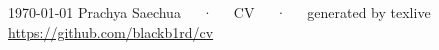 \documentclass[11pt, a4paper]{awesome-cv}
\begin{document}
\makecvheader[C]

\makecvfooter
  {\today}
  {Prachya Saechua~~~·~~~CV~~~·~~~generated by texlive \href{https://github.com/blackb1rd/cv}{https://github.com/blackb1rd/cv}}
  {\thepage}









\end{document}
